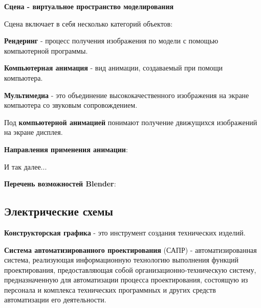 \documentclass{article}
\begin{document}
\begin{flushleft}
\textbf{Сцена - виртуальное пространство моделирования}

Сцена включает в себя несколько категорий объектов:

\begin{multienumerate}
\end{multienumerate}

\textbf{Рендеринг} - процесс получения изображения по модели с помощью компьютерной программы.

\hfill

\textbf{Компьютерная анимация} - вид анимации, создаваемый при помощи компьютера.

\textbf{Мультимедиа} - это объединение высококачественного изображения на экране компьютера со звуковым сопровождением.

Под \textbf{компьютерной анимацией} понимают получение движущихся изображений на экране дисплея.

\hfill

\textbf{Направления применения анимации}:

\begin{multienumerate}
    \begin{center}
        И так далее...
    \end{center}
\end{multienumerate}

\textbf{Перечень возможностей Blender}:

\begin{multienumerate}
\end{multienumerate}

\subsection{Электрические схемы}

\textbf{Конструкторская графика} - это инструмент создания технических изделий.

\hfill

\textbf{Система автоматизированного проектирования} (САПР) - автоматизированная система, реализующая информационную технологию выполнения функций проектирования, предоставляющая собой организационно-техническую систему, предназначенную для автоматизации процесса проектирования, состоящую из персонала и комплекса технических программных и других средств автоматизации его деятельности.


\end{flushleft}
\end{document}
